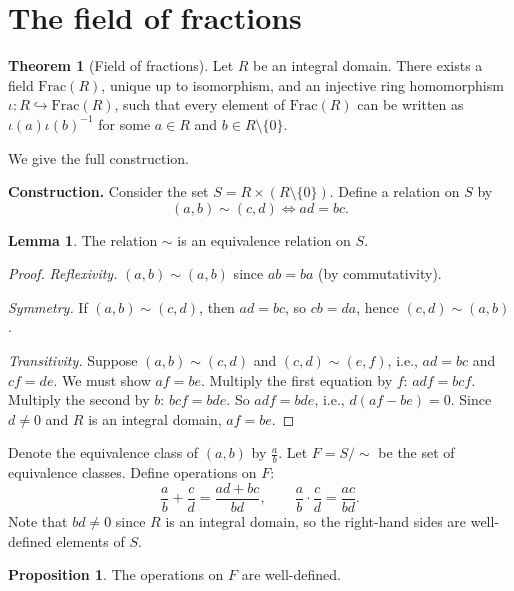 \documentclass[12pt,a4paper,openany]{book}
\theoremstyle{definition}
\newtheorem{theorem}{Theorem}[chapter]
\newtheorem{proposition}{Proposition}[chapter]
\newtheorem{lemma}{Lemma}[chapter]
\theoremstyle{remark}
\begin{document}
\section{The field of fractions}\label{sec:field-of-fractions}

\begin{theorem}[Field of fractions]\label{thm:field-of-fractions}
Let $R$ be an integral domain. There exists a field $\mathrm{Frac}(R)$, unique up to isomorphism, and an injective ring homomorphism $\iota\colon R\hookrightarrow\mathrm{Frac}(R)$, such that every element of $\mathrm{Frac}(R)$ can be written as $\iota(a)\iota(b)^{-1}$ for some $a\in R$ and $b\in R\setminus\{0\}$.
\end{theorem}

We give the full construction.

\textbf{Construction.} Consider the set $S=R\times(R\setminus\{0\})$. Define a relation on $S$ by
\[
    (a,b)\sim(c,d)\iff ad=bc.
\]

\begin{lemma}\label{lem:frac-equivalence}
The relation $\sim$ is an equivalence relation on $S$.
\end{lemma}

\begin{proof}
\emph{Reflexivity.} $(a,b)\sim(a,b)$ since $ab=ba$ (by commutativity).

\emph{Symmetry.} If $(a,b)\sim(c,d)$, then $ad=bc$, so $cb=da$, hence $(c,d)\sim(a,b)$.

\emph{Transitivity.} Suppose $(a,b)\sim(c,d)$ and $(c,d)\sim(e,f)$, i.e., $ad=bc$ and $cf=de$. We must show $af=be$. Multiply the first equation by $f$: $adf=bcf$. Multiply the second by $b$: $bcf=bde$. So $adf=bde$, i.e., $d(af-be)=0$. Since $d\neq 0$ and $R$ is an integral domain, $af=be$.
\end{proof}

Denote the equivalence class of $(a,b)$ by $\frac{a}{b}$. Let $F=S/{\sim}$ be the set of equivalence classes. Define operations on $F$:
\[
    \frac{a}{b}+\frac{c}{d}=\frac{ad+bc}{bd},\qquad \frac{a}{b}\cdot\frac{c}{d}=\frac{ac}{bd}.
\]
Note that $bd\neq 0$ since $R$ is an integral domain, so the right-hand sides are well-defined elements of $S$.

\begin{proposition}\label{prop:frac-welldef}
The operations on $F$ are well-defined.
\end{proposition}
\end{document}
